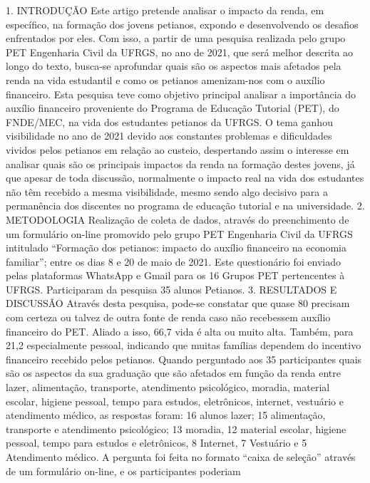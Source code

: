 1. INTRODUÇÃO
Este artigo pretende analisar o impacto da renda, em específico, na formação dos jovens
petianos, expondo e desenvolvendo os desafios enfrentados por eles. Com isso, a partir de uma
pesquisa realizada pelo grupo PET Engenharia Civil da UFRGS, no ano de 2021, que será
melhor descrita ao longo do texto, busca-se aprofundar quais são os aspectos mais afetados pela
renda na vida estudantil e como os petianos amenizam-nos com o auxílio financeiro.
Esta pesquisa teve como objetivo principal analisar a importância do auxílio financeiro
proveniente do Programa de Educação Tutorial (PET), do FNDE/MEC, na vida dos estudantes
petianos da UFRGS. O tema ganhou visibilidade no ano de 2021 devido aos constantes
problemas e dificuldades vividos pelos petianos em relação ao custeio, despertando assim o
interesse em analisar quais são os principais impactos da renda na formação destes jovens, já que
apesar de toda discussão, normalmente o impacto real na vida dos estudantes não têm recebido a
mesma visibilidade, mesmo sendo algo decisivo para a permanência dos discentes no programa
de educação tutorial e na universidade.
2. METODOLOGIA
Realização de coleta de dados, através do preenchimento de um formulário on-line
promovido pelo grupo PET Engenharia Civil da UFRGS intitulado “Formação dos petianos:
impacto do auxílio financeiro na economia familiar”; entre os dias 8 e 20 de maio de 2021. Este
questionário foi enviado pelas plataformas WhatsApp e Gmail para os 16 Grupos PET
pertencentes à UFRGS. Participaram da pesquisa 35 alunos Petianos.
3. RESULTADOS E DISCUSSÃO
Através desta pesquisa, pode-se constatar que quase 80%
precisam com certeza ou talvez de outra fonte de renda caso não recebessem auxílio financeiro
do PET. Aliado a isso, 66,7%
vida é alta ou muito alta. Também, para 21,2%
especialmente pessoal, indicando que muitas famílias dependem do incentivo financeiro recebido
pelos petianos. Quando perguntado aos 35 participantes quais são os aspectos da sua graduação
que são afetados em função da renda entre lazer, alimentação, transporte, atendimento
psicológico, moradia, material escolar, higiene pessoal, tempo para estudos, eletrônicos,
internet, vestuário e atendimento médico, as respostas foram: 16 alunos lazer; 15 alimentação,
transporte e atendimento psicológico; 13 moradia, 12 material escolar, higiene pessoal, tempo
para estudos e eletrônicos, 8 Internet, 7 Vestuário e 5 Atendimento médico. A pergunta foi feita
no formato “caixa de seleção” através de um formulário on-line, e os participantes poderiam
